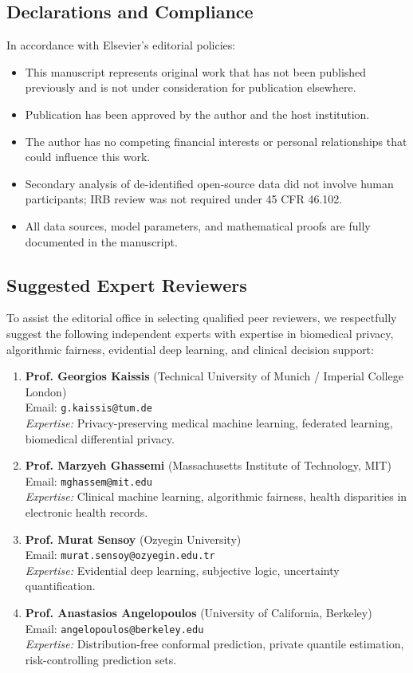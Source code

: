 \documentclass[11pt,a4paper]{article}
\begin{document}
\subsection*{Declarations and Compliance}
In accordance with Elsevier's editorial policies:
\begin{itemize}[leftmargin=*,itemsep=2pt,topsep=2pt]
    \item This manuscript represents original work that has not been published previously and is not under consideration for publication elsewhere.
    \item Publication has been approved by the author and the host institution.
    \item The author has no competing financial interests or personal relationships that could influence this work.
    \item Secondary analysis of de-identified open-source data did not involve human participants; IRB review was not required under 45 CFR 46.102.
    \item All data sources, model parameters, and mathematical proofs are fully documented in the manuscript.
\end{itemize}

\subsection*{Suggested Expert Reviewers}
To assist the editorial office in selecting qualified peer reviewers, we respectfully suggest the following independent experts with expertise in biomedical privacy, algorithmic fairness, evidential deep learning, and clinical decision support:
\begin{enumerate}[leftmargin=*,itemsep=3pt,topsep=2pt]
    \item \textbf{Prof. Georgios Kaissis} (Technical University of Munich / Imperial College London) \\
    Email: \texttt{g.kaissis@tum.de} \\
    \emph{Expertise:} Privacy-preserving medical machine learning, federated learning, biomedical differential privacy.
    \item \textbf{Prof. Marzyeh Ghassemi} (Massachusetts Institute of Technology, MIT) \\
    Email: \texttt{mghassem@mit.edu} \\
    \emph{Expertise:} Clinical machine learning, algorithmic fairness, health disparities in electronic health records.
    \item \textbf{Prof. Murat Sensoy} (Ozyegin University) \\
    Email: \texttt{murat.sensoy@ozyegin.edu.tr} \\
    \emph{Expertise:} Evidential deep learning, subjective logic, uncertainty quantification.
    \item \textbf{Prof. Anastasios Angelopoulos} (University of California, Berkeley) \\
    Email: \texttt{angelopoulos@berkeley.edu} \\
    \emph{Expertise:} Distribution-free conformal prediction, private quantile estimation, risk-controlling prediction sets.
\end{enumerate}
\end{document}
